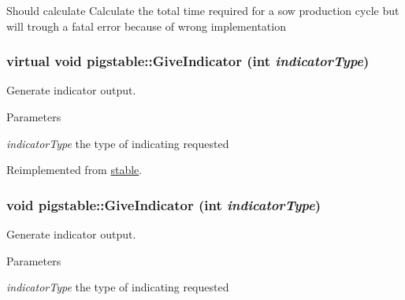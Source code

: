 \label{classpigstable_a66c14d2be32d4dba34a32ece913a3073}
Should calculate Calculate the total time required for a sow production cycle but will trough a fatal error because of wrong implementation \hypertarget{classpigstable_a809943d3ff6f8314d92bfc1b29dec8af}{
\subsubsection[{GiveIndicator}]{\setlength{\rightskip}{0pt plus 5cm}virtual void pigstable::GiveIndicator (int {\em indicatorType})}}
\label{classpigstable_a809943d3ff6f8314d92bfc1b29dec8af}


Generate indicator output. 
\begin{DoxyParams}{Parameters}
\item[{\em indicatorType}]the type of indicating requested \end{DoxyParams}


Reimplemented from \hyperlink{classstable_a2911ffc8041366d46674bf48a6b4d6c5}{stable}.\hypertarget{classpigstable_a55806be52263692f12d10870d9ee86eb}{
\subsubsection[{GiveIndicator}]{\setlength{\rightskip}{0pt plus 5cm}void pigstable::GiveIndicator (int {\em indicatorType})}}
\label{classpigstable_a55806be52263692f12d10870d9ee86eb}


Generate indicator output. 
\begin{DoxyParams}{Parameters}
\item[{\em indicatorType}]the type of indicating requested \end{DoxyParams}


